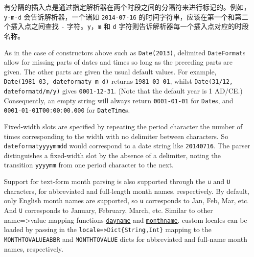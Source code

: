 有分隔的插入点是通过指定解析器在两个时段之间的分隔符来进行标记的。例如，\texttt{{\textquotedbl}y-m-d{\textquotedbl}} 会告诉解析器，一个诸如 \texttt{{\textquotedbl}2014-07-16{\textquotedbl}} 的时间字符串，应该在第一个和第二个插入点之间查找 \texttt{-} 字符。\texttt{y}，\texttt{m} 和 \texttt{d} 字符则告诉解析器每一个插入点对应的时段名称。



As in the case of constructors above such as \texttt{Date(2013)}, delimited \texttt{DateFormat}s allow for missing parts of dates and times so long as the preceding parts are given. The other parts are given the usual default values.  For example, \texttt{Date({\textquotedbl}1981-03{\textquotedbl}, dateformat{\textquotedbl}y-m-d{\textquotedbl})} returns \texttt{1981-03-01}, whilst \texttt{Date({\textquotedbl}31/12{\textquotedbl}, dateformat{\textquotedbl}d/m/y{\textquotedbl})} gives \texttt{0001-12-31}.  (Note that the default year is 1 AD/CE.) Consequently, an empty string will always return \texttt{0001-01-01} for \texttt{Date}s, and \texttt{0001-01-01T00:00:00.000} for \texttt{DateTime}s.



Fixed-width slots are specified by repeating the period character the number of times corresponding to the width with no delimiter between characters. So \texttt{dateformat{\textquotedbl}yyyymmdd{\textquotedbl}} would correspond to a date string like \texttt{{\textquotedbl}20140716{\textquotedbl}}. The parser distinguishes a fixed-width slot by the absence of a delimiter, noting the transition \texttt{{\textquotedbl}yyyymm{\textquotedbl}} from one period character to the next.



Support for text-form month parsing is also supported through the \texttt{u} and \texttt{U} characters, for abbreviated and full-length month names, respectively. By default, only English month names are supported, so \texttt{u} corresponds to {\textquotedbl}Jan{\textquotedbl}, {\textquotedbl}Feb{\textquotedbl}, {\textquotedbl}Mar{\textquotedbl}, etc. And \texttt{U} corresponds to {\textquotedbl}January{\textquotedbl}, {\textquotedbl}February{\textquotedbl}, {\textquotedbl}March{\textquotedbl}, etc. Similar to other name=>value mapping functions \hyperlink{2440842966718954493}{\texttt{dayname}} and \hyperlink{16585759639636493546}{\texttt{monthname}}, custom locales can be loaded by passing in the \texttt{locale=>Dict\{String,Int\}} mapping to the \texttt{MONTHTOVALUEABBR} and \texttt{MONTHTOVALUE} dicts for abbreviated and full-name month names, respectively.



